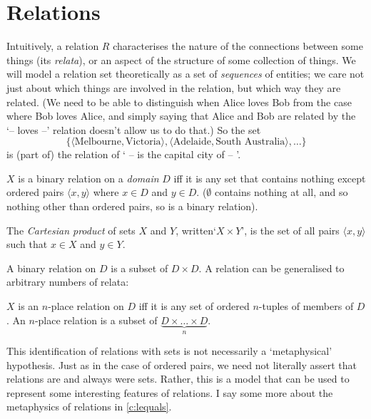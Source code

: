 \section{Relations}
Intuitively, a relation $R$ characterises the nature of the connections between some things (its \emph{relata}), or an aspect of the structure of some collection of things. We will model a relation set theoretically as a set of \emph{sequences} of entities; we care not just about which things are involved in the relation, but which way they are related. (We need to be able to distinguish when Alice loves Bob from the case where Bob loves Alice, and simply saying that Alice and Bob are related by the `– loves –' relation doesn't allow us to do that.)  So the set $$\{\langle \text{Melbourne}, \text{Victoria}\rangle, \langle \text{Adelaide}, \text{South Australia}\rangle,\ldots\}$$ is (part of) the relation of ` –  is the capital city of  – '.
\begin{definition}
	$X$ is a binary relation on a \emph{domain} $D$ iff it is any set that contains nothing except ordered pairs $\langle x,y\rangle$ where $x \in D$ and $y\in D$. ($\emptyset$ contains nothing at all, and so nothing other than ordered pairs, so is a binary relation).
\end{definition}
\begin{definition}
	The \emph{Cartesian product} of sets $X$ and 	$Y$, written‘$X \times Y$’, is the set of all pairs $\langle x,y\rangle$ such that $x \in X$ and $y \in Y$.
\end{definition} A binary relation on $D$ is a subset of $D \times D$. A relation can be generalised to arbitrary numbers of relata: 
\begin{definition}
  $X$ is an $n$-place relation on $D$ iff it is any set of ordered $n$-tuples of members of $D$. An $n$-place relation is a subset of $\underbrace{D \times \ldots \times D}_{n}$.
\end{definition}
This identification of relations with sets is not necessarily a `metaphysical' hypothesis. Just as in the case of ordered pairs, we need not literally assert that relations are and always were sets. Rather, this is a model that can be used to represent some interesting features of relations. I say some more about the metaphysics of relations in \autoref{c:lequals}.


